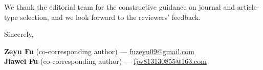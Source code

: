 \documentclass[11pt,letterpaper]{article}
\begin{document}
We thank the editorial team for the constructive guidance on journal and article-type selection, and we look forward to the reviewers' feedback.

\vspace{0.8em}
\noindent Sincerely,

\vspace{0.6em}
\noindent\textbf{Zeyu Fu} (co-corresponding author) --- \href{mailto:fuzeyu09@gmail.com}{fuzeyu09@gmail.com}\\
\noindent\textbf{Jiawei Fu} (co-corresponding author) --- \href{mailto:fjw813130855@163.com}{fjw813130855@163.com}
\end{document}
